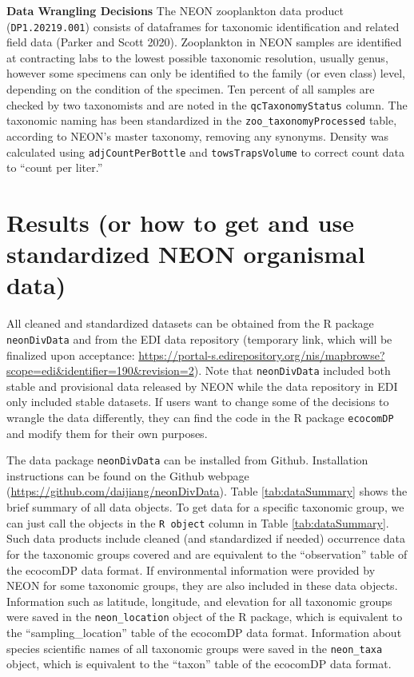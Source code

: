 \documentclass[
  12pt,
]{article}
\begin{document}
\textbf{Data Wrangling Decisions} The NEON zooplankton data product (\texttt{DP1.20219.001}) consists of dataframes for taxonomic identification and related field data (Parker and Scott 2020). Zooplankton in NEON samples are identified at contracting labs to the lowest possible taxonomic resolution, usually genus, however some specimens can only be identified to the family (or even class) level, depending on the condition of the specimen. Ten percent of all samples are checked by two taxonomists and are noted in the \texttt{qcTaxonomyStatus} column. The taxonomic naming has been standardized in the \texttt{zoo\_taxonomyProcessed} table, according to NEON's master taxonomy, removing any synonyms. Density was calculated using \texttt{adjCountPerBottle} and \texttt{towsTrapsVolume} to correct count data to ``count per liter.''

\hypertarget{results-or-how-to-get-and-use-standardized-neon-organismal-data}{%
\section{Results (or how to get and use standardized NEON organismal data)}\label{results-or-how-to-get-and-use-standardized-neon-organismal-data}}

All cleaned and standardized datasets can be obtained from the R package \texttt{neonDivData} and from the EDI data repository (temporary link, which will be finalized upon acceptance: \url{https://portal-s.edirepository.org/nis/mapbrowse?scope=edi\&identifier=190\&revision=2}). Note that \texttt{neonDivData} included both stable and provisional data released by NEON while the data repository in EDI only included stable datasets. If users want to change some of the decisions to wrangle the data differently, they can find the code in the R package \texttt{ecocomDP} and modify them for their own purposes.

The data package \texttt{neonDivData} can be installed from Github. Installation instructions can be found on the Github webpage (\url{https://github.com/daijiang/neonDivData}). Table \ref{tab:dataSummary} shows the brief summary of all data objects. To get data for a specific taxonomic group, we can just call the objects in the \texttt{R\ object} column in Table \ref{tab:dataSummary}. Such data products include cleaned (and standardized if needed) occurrence data for the taxonomic groups covered and are equivalent to the ``observation'' table of the ecocomDP data format. If environmental information were provided by NEON for some taxonomic groups, they are also included in these data objects. Information such as latitude, longitude, and elevation for all taxonomic groups were saved in the \texttt{neon\_location} object of the R package, which is equivalent to the ``sampling\_location'' table of the ecocomDP data format. Information about species scientific names of all taxonomic groups were saved in the \texttt{neon\_taxa} object, which is equivalent to the ``taxon'' table of the ecocomDP data format.
\end{document}
